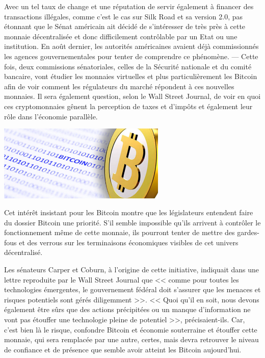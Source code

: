 \documentclass[11pt,twoside,a4paper]{article}
\begin{document}
Avec un tel taux de change et une r{\'e}putation de servir {\'e}galement {\`a} financer des transactions ill{\'e}gales, comme c'est le cas sur Silk Road et sa version 2.0, pas {\'e}tonnant que le S{\'e}nat am{\'e}ricain ait d{\'e}cid{\'e} de s'int{\'e}resser de tr{\`e}s pr{\`e}s {\`a} cette monnaie d{\'e}centralis{\'e}e et donc difficilement contr{\^o}lable par un Etat ou une institution. En ao{\^u}t dernier, les autorit{\'e}s am{\'e}ricaines avaient d{\'e}j{\`a} commissionn{\'e}s les agences gouvernementales pour tenter de comprendre ce ph{\'e}nom{\`e}ne. --- Cette fois, deux commissions s{\'e}natoriales, celles de la S{\'e}curit{\'e} nationale et du comit{\'e} bancaire, vont {\'e}tudier les monnaies virtuelles et plus particuli{\`e}rement les Bitcoin afin de voir comment les r{\'e}gulateurs du march{\'e} r{\'e}pondent {\`a} ces nouvelles monnaies. Il sera {\'e}galement question, selon le Wall Street Journal, de voir en quoi ces cryptomonnaies g{\^e}nent la perception de taxes et d'imp{\^o}ts et {\'e}galement leur r{\^o}le dans l'{\'e}conomie parall{\`e}le. ~\\

\begin{minipage}[ht]{8.25cm}
	\includegraphics[width=8.00cm]{img/815660.jpg}~\\
\end{minipage} \hfill \begin{minipage}[ht]{11.00cm}
	Cet int{\'e}r{\^e}t insistant pour les Bitcoin montre que les l{\'e}gislateurs entendent faire du dossier Bitcoin une priorit{\'e}. S'il semble impossible qu'ils arrivent {\`a} contr{\^o}ler le fonctionnement m{\^e}me de cette monnaie, ils pourront tenter de mettre des gardes-fous et des verrous sur les terminaisons {\'e}conomiques visibles de cet univers d{\'e}centralis{\'e}. ~\\
\end{minipage}

Les s{\'e}nateurs Carper et Coburn, {\`a} l'origine de cette initiative, indiquait dans une lettre reproduite par le Wall Street Journal que << comme pour toutes les technologies {\'e}mergentes, le gouvernement f{\'e}d{\'e}ral doit s'assurer que les menaces et risques potentiels sont g{\'e}r{\'e}s diligemment >>. << Quoi qu'il en soit, nous devons {\'e}galement {\^e}tre s{\^u}rs que des actions pr{\'e}cipit{\'e}es ou un manque d'information ne vont pas {\'e}touffer une technologie pleine de potentiel >>, pr{\'e}cisaient-ils. Car, c'est bien l{\`a} le risque, confondre Bitcoin et {\'e}conomie souterraine et {\'e}touffer cette monnaie, qui sera remplac{\'e}e par une autre, certes, mais devra retrouver le niveau de confiance et de pr{\'e}sence que semble avoir atteint les Bitcoin aujourd'hui. ~\\
\end{document}
